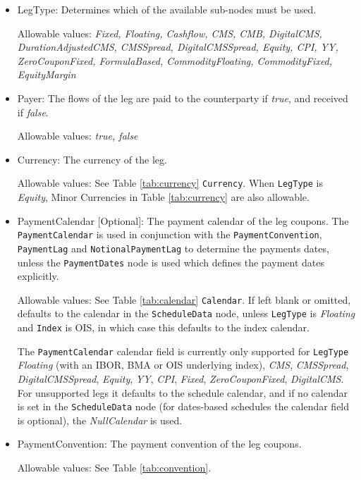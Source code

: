 \begin{itemize}
\item LegType:  Determines which of the available sub-nodes must be
  used. 

Allowable values:  \emph{Fixed, Floating, Cashflow, CMS, CMB, DigitalCMS, DurationAdjustedCMS, CMSSpread, DigitalCMSSpread, Equity, CPI, YY, ZeroCouponFixed, FormulaBased, CommodityFloating, CommodityFixed, EquityMargin} 

\item Payer:  The flows of the leg are paid to the counterparty if
  \emph{true}, and received if \emph{false}.  

Allowable values:  \emph{true, false} 

\item Currency: The currency of the leg. 

Allowable values:  See Table \ref{tab:currency} \lstinline!Currency!. When \lstinline!LegType! is \emph{Equity}, Minor Currencies in Table \ref{tab:currency} are also allowable.

\item PaymentCalendar [Optional]: The payment calendar of the leg coupons. The \lstinline!PaymentCalendar! is used in conjunction with the \lstinline!PaymentConvention!, \lstinline!PaymentLag! and \lstinline!NotionalPaymentLag! to determine the payments dates, unless the \lstinline!PaymentDates! node is used which defines the payment dates explicitly.

Allowable values: See Table \ref{tab:calendar} \lstinline!Calendar!. If left blank or omitted, defaults to the calendar in the \lstinline!ScheduleData! node, unless \lstinline!LegType! is \emph{Floating} and \lstinline!Index! is OIS, in which case this defaults to the index calendar. 

The \lstinline!PaymentCalendar! calendar field is currently only supported for \lstinline!LegType! \emph{Floating} (with an IBOR, BMA or OIS underlying index), \emph{CMS}, \emph{CMSSpread}, \emph{DigitalCMSSpread}, \emph{Equity}, \emph{YY}, \emph{CPI}, \emph{Fixed}, \emph{ZeroCouponFixed}, \emph{DigitalCMS}. For unsupported legs it defaults to the schedule calendar, and if no calendar is set in the \lstinline!ScheduleData! node (for dates-based schedules the calendar field is optional), the \emph{NullCalendar} is used. 

\item PaymentConvention: The payment convention of the leg coupons. 

Allowable values: See Table \ref{tab:convention}.


\end{itemize}
